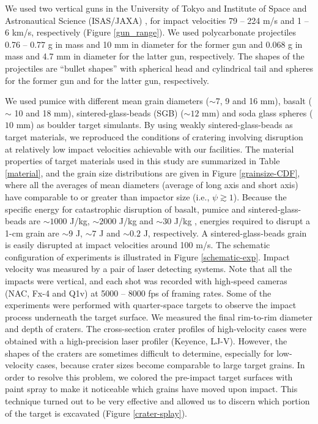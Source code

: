 \documentclass[3p,authoryear]{elsarticle}
\begin{document}

We used two vertical guns in the University of Tokyo and Institute of Space and Astronautical Science (ISAS/JAXA) , for impact velocities 79 -- 224 m/s and 1 -- 6 km/s, respectively (Figure \ref{gun_range}). We used polycarbonate projectiles 0.76 -- 0.77 g in mass and 10 mm in diameter for the former gun and 0.068 g in mass and 4.7 mm in diameter for the latter gun, respectively.
The shapes of the projectiles are ``bullet shapes'' with spherical head and cylindrical tail and spheres for the former gun and for the latter gun, respectively.

We used pumice with different mean grain diameters ($\sim$7, 9 and 16 mm), basalt ($\sim$ 10 and 18 mm), sintered-glass-beads (SGB) ($\sim 12$ mm) and soda glass spheres ($10$ mm) as boulder target simulants.
By using weakly sintered-glass-beads \citep[e.g.][]{setoh2010} as target materials, we reproduced the conditions of cratering involving disruption at relatively low impact velocities achievable with our facilities.
 The material properties of target materials used in this study are summarized in Table \ref{material}, and the grain size distributions are given in Figure \ref{grainsize-CDF}, where all the averages of mean diameters (average of long axis and short axis) have comparable to or greater than impactor size (i.e., $\psi \gtrsim 1$).
Because the specific energy for catastrophic disruption of basalt, pumice and sintered-glass-beads are $\sim 1000$ J/kg, $\sim 2000$ J/kg and $\sim 30$ J/kg \citep{takagi1984,HH1999,setoh2010,patmore2014,flynn2015}, energies required to disrupt a 1-cm grain are $\sim 9$ J, $\sim 7$ J and $\sim 0.2$ J, respectively.
A sintered-glass-beads grain is easily disrupted at impact velocities around 100 m/s.
The schematic configuration of experiments is illustrated in Figure \ref{schematic-exp}. Impact velocity was measured by a pair of laser detecting systems.
 Note that all the impacts were vertical, and each shot was recorded with high-speed cameras (NAC, Fx-4 and Q1v) at 5000 -- 8000 fps of framing rates.
 Some of the experiments were performed with quarter-space targets to observe the impact process underneath the target surface.
We measured the final rim-to-rim diameter and depth of craters. The cross-section crater profiles of high-velocity cases were obtained with a high-precision laser profiler (Keyence, LJ-V).
However, the shapes of the craters are sometimes difficult to determine, especially for low-velocity cases, because crater sizes become comparable to large target grains.
In order to resolve this problem, we colored the pre-impact target surfaces with paint spray to make it noticeable which grains have moved upon impact.
This technique turned out to be very effective and allowed us to discern which portion of the target is excavated (Figure \ref{crater-splay}).
\end{document}
